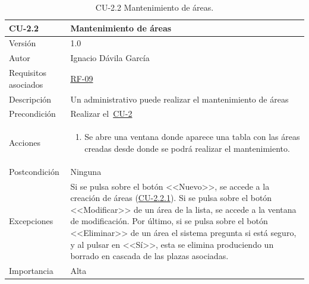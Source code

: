 \begin{table}[p]
	\centering
	\begin{tabularx}{\linewidth}{ p{} p{} }
		\toprule
		\textbf{CU-2.2}    & \textbf{Mantenimiento de áreas}\\
		\toprule
		{\small Versión}              & 1.0    \\
		{\small Autor}                & Ignacio Dávila García \\
		{\small Requisitos asociados} & \hyperref[itm:RF9]{RF-09} \\
		{\small Descripción}          & Un administrativo puede realizar el mantenimiento de áreas \\
		{\small Precondición}         & Realizar el~\hyperref[table:CU-2]{CU-2} \\
		{\small Acciones}             &
		\begin{enumerate}
			\def\labelenumi{\arabic{enumi}.}
			\tightlist
			\item Se abre una ventana donde aparece una tabla con las áreas creadas desde donde se podrá realizar el mantenimiento.
		\end{enumerate}\\
		{\small Postcondición}        & Ninguna \\
		{\small Excepciones}          & Si se pulsa sobre el botón <<Nuevo>>, se accede a la creación de áreas (\hyperref[table:CU-2_2_1]{CU-2.2.1}). Si se pulsa sobre el botón <<Modificar>> de un área de la lista, se accede a la ventana de modificación. Por último, si se pulsa sobre el botón <<Eliminar>> de un área el sistema pregunta si está seguro, y al pulsar en <<Sí>>, esta se elimina produciendo un borrado en cascada de las plazas asociadas. \\
		{\small Importancia}          & Alta \\
		\bottomrule
	\end{tabularx}
	\caption{CU-2.2 Mantenimiento de áreas.}\label{table:CU-2_2}
\end{table}
\FloatBarrier

